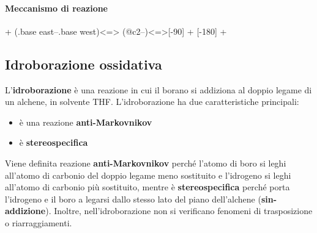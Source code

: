 \paragraph{Meccanismo di reazione}
\begin{reaction}
	 + 
	\arrow(.base east--.base west){<=>}
	 \+{.5em,.5em} 
	\arrow(@c2--){<=>}[-90]
	 + 
	\arrow{<=>}[-180]
	 + 
\end{reaction}


\subsection{Idroborazione ossidativa}\label{ssec:idroborazione} 
L'\textbf{idroborazione} è una reazione in cui il borano  si addiziona al doppio legame di un alchene, in solvente THF. L'idroborazione ha due caratteristiche principali:
\begin{itemize}
	\item è una reazione \textbf{anti-Markovnikov}
	\item è \textbf{stereospecifica}
\end{itemize}
Viene definita reazione \textbf{anti-Markovnikov} perché l'atomo di boro si leghi all'atomo di carbonio del doppio legame meno sostituito e l'idrogeno si leghi all'atomo di carbonio più sostituito, mentre è \textbf{stereospecifica} perché porta l'idrogeno e il boro a legarsi dallo stesso lato del piano dell'alchene (\textbf{sin-addizione}). Inoltre, nell'idroborazione non si verificano fenomeni di trasposizione o riarraggiamenti.

